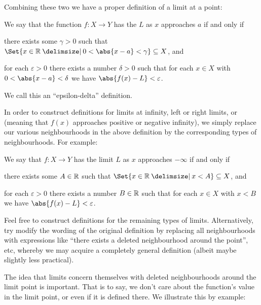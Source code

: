 Combining these two we have a proper definition of a limit at a point:

\begin{definition}
	We say that the function $f \colon X \to Y$ has the  $L$ as $x$ approaches $a$ if and only if
	\begin{romanlist}
		\item there exists some $\gamma > 0$ such that $\Set{x \in \R \given 0 < \abs{x - a} < \gamma} \subseteq X$, and
		\item for each $\varepsilon > 0$ there exists a number $\delta > 0$ such that for each $x \in X$ with $0 < \abs{x - a} < \delta$ we have $\abs{f(x) - L} < \varepsilon$.
	\end{romanlist}
\end{definition}

\noindent
We call this an ``epsilon-delta'' definition.

In order to construct definitions for limits at infinity, left or right limits, or  (meaning that $f(x)$ approaches positive or negative infinity), we simply replace our various neighbourhoods in the above definition by the corresponding types of neighbourhoods. For example:

\begin{definition}
	We say that $f \colon X \to Y$ has the limit $L$ as $x$ approaches $-\infty$ if and only if
	\begin{romanlist}
		\item there exists some $A \in \mathbb{R}$ such that $\Set{x \in \R \given x < A} \subseteq X$, and
		\item for each $\varepsilon > 0$ there exists a number $B \in \mathbb{R}$ such that for each $x \in X$ with $x < B$ we have $\abs{f(x) - L} < \varepsilon$.
	\end{romanlist}
\end{definition}

\begin{exercise}
	Feel free to construct definitions for the remaining types of limits. Alternatively, try modify the wording of the original definition by replacing all neighbourhoods with expressions like ``there exists a deleted neighbourhood around the point'', etc, whereby we may acquire a completely general definition (albeit maybe slightly less practical).
\end{exercise}

\noindent
The idea that limits concern themselves with deleted neighbourhoods around the limit point is important. That is to say, we don't care about the function's value in the limit point, or even if it is defined there. We illustrate this by example:

